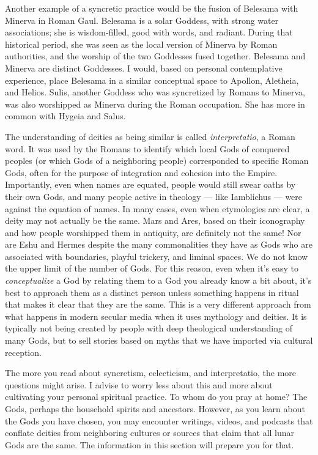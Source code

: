 \documentclass[
]{book}
\begin{document}
Another example of a syncretic practice would be the fusion of Belesama with Minerva in Roman Gaul. Belesama is a solar Goddess, with strong water associations; she is wisdom-filled, good with words, and radiant. During that historical period, she was seen as the local version of Minerva by Roman authorities, and the worship of the two Goddesses fused together. Belesama and Minerva are distinct Goddesses. I would, based on personal contemplative experience, place Belesama in a similar conceptual space to Apollon, Aletheia, and Helios. Sulis, another Goddess who was syncretized by Romans to Minerva, was also worshipped as Minerva during the Roman occupation. She has more in common with Hygeia and Salus.

The understanding of deities as being similar is called \emph{interpretatio}, a Roman word. It was used by the Romans to identify which local Gods of conquered peoples (or which Gods of a neighboring people) corresponded to specific Roman Gods, often for the purpose of integration and cohesion into the Empire. Importantly, even when names are equated, people would still swear oaths by their own Gods, and many people active in theology --- like Iamblichus --- were against the equation of names. In many cases, even when etymologies are clear, a deity may not actually be the same. Mars and Ares, based on their iconography and how people worshipped them in antiquity, are definitely not the same! Nor are Eshu and Hermes despite the many commonalities they have as Gods who are associated with boundaries, playful trickery, and liminal spaces. We do not know the upper limit of the number of Gods. For this reason, even when it's easy to \emph{conceptualize} a God by relating them to a God you already know a bit about, it's best to approach them as a distinct person unless something happens in ritual that makes it clear that they are the same. This is a very different approach from what happens in modern secular media when it uses mythology and deities. It is typically not being created by people with deep theological understanding of many Gods, but to sell stories based on myths that we have imported via cultural reception.

The more you read about syncretism, eclecticism, and interpretatio, the more questions might arise. I advise to worry less about this and more about cultivating your personal spiritual practice. To whom do you pray at home? The Gods, perhaps the household spirits and ancestors. However, as you learn about the Gods you have chosen, you may encounter writings, videos, and podcasts that conflate deities from neighboring cultures or sources that claim that all lunar Gods are the same. The information in this section will prepare you for that.
\end{document}
